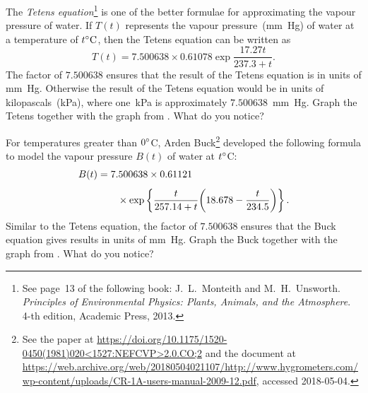 \documentclass[a4paper,oneside,12pt]{article}
\begin{document}
\begin{problem}
\begin{packedenum}
  \item\label{subprob:exponential:vapour_pressure_Tetens}
    The \emph{Tetens equation}\footnote{
      See page~13 of the following book:
      J.~L.~Monteith and M.~H.~Unsworth.
      \emph{Principles of Environmental Physics: Plants, Animals, and
        the Atmosphere}. 4-th edition, Academic Press, 2013.
    }
    is one of the better formulae for approximating the vapour
    pressure of water.  If $T(t)$ represents the vapour
    pressure~(mm~Hg) of water at a temperature of ${t}^{\circ}\textrm{C}$, then
    the Tetens equation can be written as
    \begin{equation}
    \label{eqn:exponential:vapour_pressure_Tetens}
    T(t)
    =
    7.500638 \times 0.61078
    \exp{
      \frac{
        17.27t
      }{
        237.3 + t
      }
    }.
    \end{equation}
    The factor of $7.500638$ ensures that the result of the Tetens
    equation is in units of mm~Hg.  Otherwise the result of the Tetens
    equation would be in units of kilopascals~(kPa), where one~kPa is
    approximately $7.500638$~mm~Hg.  Graph the Tetens
     together with
    the graph from .
    What do you notice?

  \item\label{subprob:exponential:vapour_pressure_Buck}
    For temperatures greater than ${0}^{\circ}$C, Arden Buck\footnote{
      See the paper at
      \url{https://doi.org/10.1175/1520-0450(1981)020<1527:NEFCVP>2.0.CO;2}
      and the document at
      \url{https://web.archive.org/web/20180504021107/http://www.hygrometers.com/wp-content/uploads/CR-1A-users-manual-2009-12.pdf},
      accessed 2018-05-04.
    }
    developed the following formula to model the vapour pressure
    $B(t)$ of water at ${t}^{\circ}$C:
    \begin{equation}
    \label{eqn:exponential:vapour_pressure_Buck}
    \begin{aligned}
    B(t)
    &=
    7.500638 \times 0.61121 \\[4pt]
    \amptab
    \times
    \exp{
      \frac{t}{257.14 + t}
      \parenthesis*{
        18.678 - \frac{t}{234.5}
      }
    }.
    \end{aligned}
    \end{equation}
    Similar to the Tetens equation, the factor of $7.500638$ ensures
    that the Buck equation gives results in units of mm~Hg.  Graph the
    Buck  together with
    the graph from .
    What do you notice?


\end{packedenum}
\end{problem}
\end{document}
